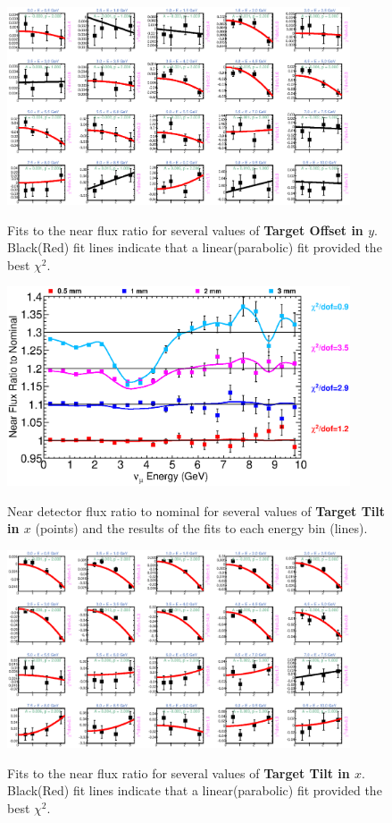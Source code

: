 \begin{figure}[hb]
  \begin{center}
    {\includegraphics[width=4.0in]{figures/TargetYOffset_near_fits.eps}}
  \end{center}
\caption{ Fits to the near flux ratio for several values of {\bf Target Offset in $y$}. Black(Red) fit lines indicate that a linear(parabolic) fit provided the best $\chi^2$. }
\end{figure}

\begin{figure}[ht]
  \begin{center}
    {\includegraphics[width=4.0in]{figures/TargetXTilt_near_summary.eps}}
  \end{center}
\caption{ Near detector flux ratio to nominal for several values of {\bf Target Tilt in $x$} (points) and the results of the fits to each energy bin (lines).}
\end{figure}

\begin{figure}[hb]
  \begin{center}
    {\includegraphics[width=4.0in]{figures/TargetXTilt_near_fits.eps}}
  \end{center}
\caption{ Fits to the near flux ratio for several values of {\bf Target Tilt in $x$}. Black(Red) fit lines indicate that a linear(parabolic) fit provided the best $\chi^2$. }
\end{figure}

